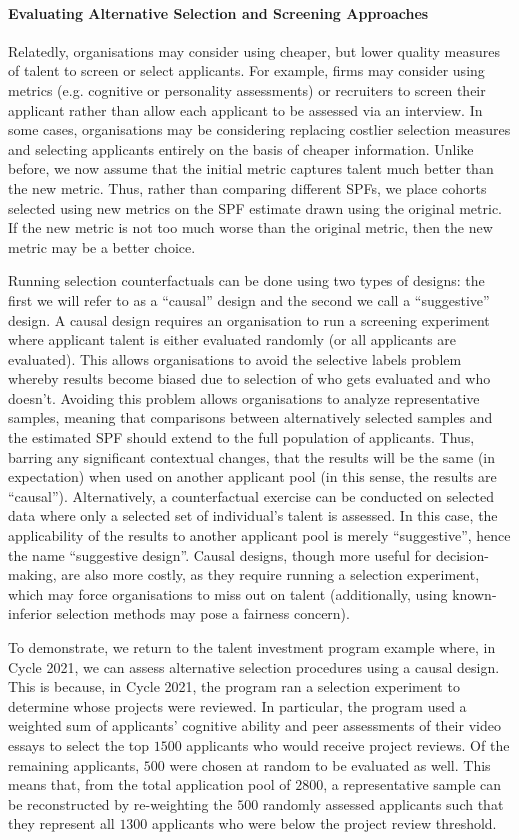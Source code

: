 \paragraph{Evaluating Alternative Selection and Screening Approaches} Relatedly, organisations may consider using cheaper, but lower quality measures of talent to screen or select applicants. For example, firms may consider using metrics (e.g. cognitive or personality assessments) or recruiters to screen their applicant rather than allow each applicant to be assessed via an interview. In some cases, organisations may be considering replacing costlier selection measures and selecting applicants entirely on the basis of cheaper information. Unlike before, we now assume that the initial metric captures talent much better than the new metric. Thus, rather than comparing different SPFs, we place cohorts selected using new metrics on the SPF estimate drawn using the original metric. If the new metric is not too much worse than the original metric, then the new metric may be a better choice.

Running selection counterfactuals can be done using two types of designs: the first we will refer to as a ``causal'' design and the second we call a ``suggestive'' design. A causal design requires an organisation to run a screening experiment where applicant talent is either evaluated randomly (or all applicants are evaluated). This allows organisations to avoid the selective labels problem whereby results become biased due to selection of who gets evaluated and who doesn't. Avoiding this problem allows organisations to analyze representative samples, meaning that comparisons between alternatively selected samples and the estimated SPF should extend to the full population of applicants. Thus, barring any significant contextual changes, that the results will be the same (in expectation) when used on another applicant pool (in this sense, the results are ``causal''). Alternatively, a counterfactual exercise can be conducted on selected data where only a selected set of individual's talent is assessed. In this case, the applicability of the results to another applicant pool is merely ``suggestive'', hence the name ``suggestive design''. Causal designs, though more useful for decision-making, are also more costly, as they require running a selection experiment, which may force organisations to miss out on talent (additionally, using known-inferior selection methods may pose a fairness concern). 

To demonstrate, we return to the talent investment program example where, in Cycle 2021, we can assess alternative selection procedures using a causal design. This is because, in Cycle 2021, the program ran a selection experiment to determine whose projects were reviewed. In particular, the program used a weighted sum of applicants' cognitive ability and peer assessments of their video essays to select the top $1500$ applicants who would receive project reviews. Of the remaining applicants, $500$ were chosen at random to be evaluated as well. This means that, from the total application pool of $2800$, a representative sample can be reconstructed by re-weighting the $500$ randomly assessed applicants such that they represent all $1300$ applicants who were below the project review threshold.

